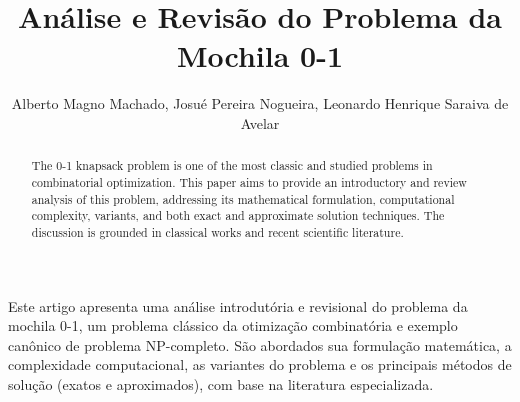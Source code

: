 \documentclass[12pt]{article}
\title{Análise e Revisão do Problema da Mochila 0-1}
\author{Alberto Magno Machado\inst{1}, Josué Pereira Nogueira\inst{1}, Leonardo Henrique Saraiva de Avelar\inst{1}}
\begin{document}
\maketitle

\begin{abstract}
    The 0-1 knapsack problem is one of the most classic and studied problems in combinatorial optimization. This paper aims to provide an introductory and review analysis of this problem, addressing its mathematical formulation, computational complexity, variants, and both exact and approximate solution techniques. The discussion is grounded in classical works and recent scientific literature.
\end{abstract}
     
\begin{resumo} 
Este artigo apresenta uma análise introdutória e revisional do problema da mochila 0-1, um problema clássico da otimização combinatória e exemplo canônico de problema NP-completo. São abordados sua formulação matemática, a complexidade computacional, as variantes do problema e os principais métodos de solução (exatos e aproximados), com base na literatura especializada.
\end{resumo}










\end{document}
